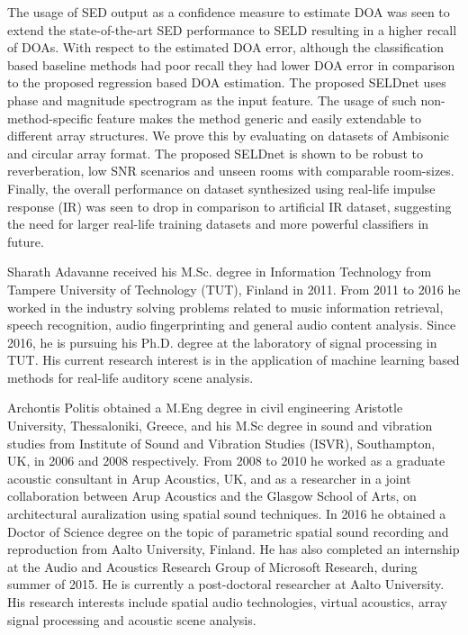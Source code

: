 \documentclass[journal]{IEEEtran}
\begin{document}
The usage of SED output as a confidence measure to estimate DOA was seen to extend the state-of-the-art SED performance to SELD resulting in a higher recall of DOAs. With respect to the estimated DOA error, although the classification based baseline methods had poor recall they had lower DOA error in comparison to the proposed regression based DOA estimation. The proposed SELDnet uses phase and magnitude spectrogram as the input feature. The usage of such non-method-specific feature makes the method generic and easily extendable to different array structures. We prove this by evaluating on datasets of Ambisonic and circular array format. The proposed SELDnet is shown to be robust to reverberation, low SNR scenarios and unseen rooms with comparable room-sizes. Finally, the overall performance on dataset synthesized using real-life impulse response (IR) was seen to drop in comparison to artificial IR dataset, suggesting the need for larger real-life training datasets and more powerful classifiers in future. 




\begin{IEEEbiography}{Sharath Adavanne} received his M.Sc. degree in Information Technology from Tampere University of Technology (TUT), Finland in 2011. From 2011 to 2016 he worked in the industry solving problems related to music information retrieval, speech recognition, audio fingerprinting and general audio content analysis. Since 2016, he is pursuing his Ph.D. degree at the laboratory of signal processing in TUT. His current research interest is in the application of machine learning based methods for real-life auditory scene analysis.
\end{IEEEbiography}

\begin{IEEEbiography}{Archontis Politis} obtained a M.Eng degree in civil engineering Aristotle University, Thessaloniki, Greece, and his M.Sc degree in sound and vibration studies from Institute of Sound and Vibration Studies (ISVR), Southampton, UK, in 2006 and 2008 respectively. From 2008 to 2010 he worked as a graduate acoustic consultant in Arup Acoustics, UK, and as a researcher in a joint collaboration between Arup Acoustics and the Glasgow School of Arts, on architectural auralization using spatial sound techniques. In 2016 he obtained a Doctor of Science degree on the topic of parametric spatial sound recording and reproduction from Aalto University, Finland. He has also completed an internship at the Audio and Acoustics Research Group of Microsoft Research, during summer of 2015. He is currently a post-doctoral researcher at Aalto University. His research interests include spatial audio technologies, virtual acoustics, array signal processing and acoustic scene analysis.\end{IEEEbiography} 
\end{document}
